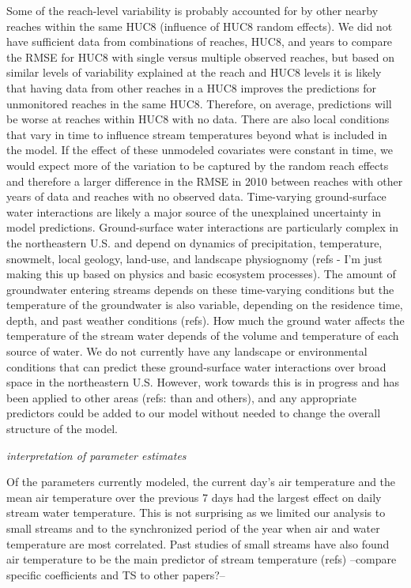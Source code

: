 Some of the reach-level variability is probably accounted for by other
nearby reaches within the same HUC8 (influence of HUC8 random effects).
We did not have sufficient data from combinations of reaches, HUC8, and
years to compare the RMSE for HUC8 with single versus multiple observed
reaches, but based on similar levels of variability explained at the
reach and HUC8 levels it is likely that having data from other reaches
in a HUC8 improves the predictions for unmonitored reaches in the same
HUC8. Therefore, on average, predictions will be worse at reaches within
HUC8 with no data. There are also local conditions that vary in time to
influence stream temperatures beyond what is included in the model. If
the effect of these unmodeled covariates were constant in time, we would
expect more of the variation to be captured by the random reach effects
and therefore a larger difference in the RMSE in 2010 between reaches
with other years of data and reaches with no observed data. Time-varying
ground-surface water interactions are likely a major source of the
unexplained uncertainty in model predictions. Ground-surface water
interactions are particularly complex in the northeastern U.S. and
depend on dynamics of precipitation, temperature, snowmelt, local
geology, land-use, and landscape physiognomy (refs - I'm just making
this up based on physics and basic ecosystem processes). The amount of
groundwater entering streams depends on these time-varying conditions
but the temperature of the groundwater is also variable, depending on
the residence time, depth, and past weather conditions (refs). How much
the ground water affects the temperature of the stream water depends of
the volume and temperature of each source of water. We do not currently
have any landscape or environmental conditions that can predict these
ground-surface water interactions over broad space in the northeastern
U.S. However, work towards this is in progress and has been applied to
other areas (refs: than and others), and any appropriate predictors
could be added to our model without needed to change the overall
structure of the model.

\emph{interpretation of parameter estimates}

Of the parameters currently modeled, the current day's air temperature
and the mean air temperature over the previous 7 days had the largest
effect on daily stream water temperature. This is not surprising as we
limited our analysis to small streams and to the synchronized period of
the year when air and water temperature are most correlated. Past
studies of small streams have also found air temperature to be the main
predictor of stream temperature (refs) --compare specific coefficients
and TS to other papers?--

